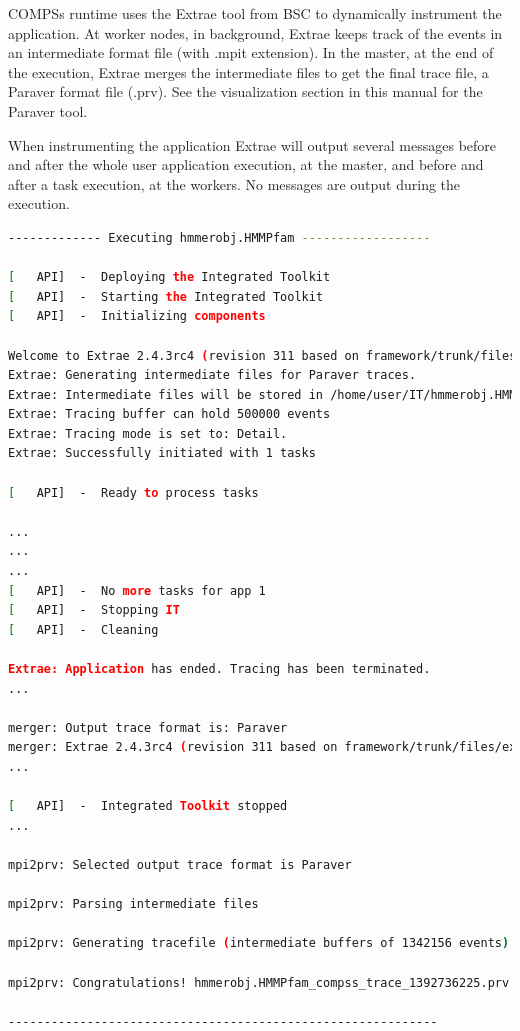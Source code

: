COMPSs runtime uses the Extrae tool from BSC to dynamically instrument the application. 
At worker nodes, in background, Extrae keeps track of the events in an intermediate format 
file (with .mpit extension). In the master, at the end of the execution, Extrae merges the 
intermediate files to get the final trace file, a Paraver format file (.prv). See the visualization 
section in this manual for the Paraver tool.

When instrumenting the application Extrae will output several messages before and after the whole 
user application execution, at the master, and before and after a task execution, at the workers. 
No messages are output during the execution.

\begin{lstlisting}[language=bash]
------------- Executing hmmerobj.HMMPfam ------------------

[   API]  -  Deploying the Integrated Toolkit
[   API]  -  Starting the Integrated Toolkit
[   API]  -  Initializing components

Welcome to Extrae 2.4.3rc4 (revision 311 based on framework/trunk/files/extrae)
Extrae: Generating intermediate files for Paraver traces.
Extrae: Intermediate files will be stored in /home/user/IT/hmmerobj.HMMPfam
Extrae: Tracing buffer can hold 500000 events
Extrae: Tracing mode is set to: Detail.
Extrae: Successfully initiated with 1 tasks

[   API]  -  Ready to process tasks

...
...
...
[   API]  -  No more tasks for app 1
[   API]  -  Stopping IT
[   API]  -  Cleaning

Extrae: Application has ended. Tracing has been terminated.
...

merger: Output trace format is: Paraver
merger: Extrae 2.4.3rc4 (revision 311 based on framework/trunk/files/extrae)
...

[   API]  -  Integrated Toolkit stopped
...

mpi2prv: Selected output trace format is Paraver

mpi2prv: Parsing intermediate files

mpi2prv: Generating tracefile (intermediate buffers of 1342156 events)

mpi2prv: Congratulations! hmmerobj.HMMPfam_compss_trace_1392736225.prv has been generated.

------------------------------------------------------------
\end{lstlisting}

